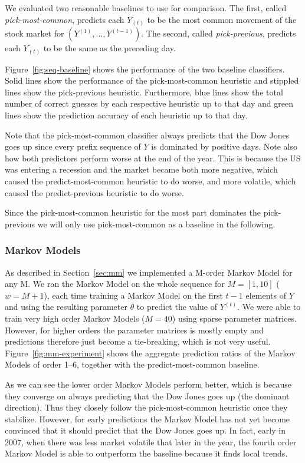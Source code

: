 \documentclass[10pt, twocolumn]{article}
\begin{document}
We evaluated two reasonable baselines to use for comparison.
The first, called \emph{pick-most-common}, predicts each $Y_{(t)}$ to be the most common movement of the stock market for $(Y^{(1)}, ..., Y^{(t-1)})$.
The second, called \emph{pick-previous}, predicts each $Y_{(t)}$ to be the same as the preceding day.

Figure~\ref{fig:seq-baseline} shows the performance of the two baseline classifiers.
Solid lines show the performance of the pick-most-common heuristic and stippled lines show the pick-previous heuristic.
Furthermore, blue lines show the total number of correct guesses by each respective heuristic up to that day and green lines show the prediction accuracy of each heuristic up to that day.

Note that the pick-most-common classifier always predicts that the Dow Jones goes up since every prefix sequence of $Y$ is dominated by positive days. 
Note also how both predictors perform worse at the end of the year.
This is because the US was entering a recession and the market became both more negative, which caused the predict-most-common heuristic to do worse, and more volatile, which caused the predict-previous heuristic to do worse.

Since the pick-most-common heuristic for the most part dominates the pick-previous we will only use pick-most-common as a baseline in the following.


\subsubsection{Markov Models}
\label{mm-eval}

As described in Section~\ref{sec:mm} we implemented a M-order Markov Model for any M.
We ran the Markov Model on the whole sequence for $M=[1,10]$ ($w=M+1$), each time training a Markov Model on the first $t-1$ elements of $Y$ and using the resulting parameter $\theta$ to predict the value of $Y^{(t)}$.
We were able to train very high order Markov Models ($M=40$) using sparse parameter matrices.
However, for higher orders the parameter matrices is mostly empty and predictions therefore just become a tie-breaking, which is not very useful.
Figure~\ref{fig:mm-experiment} shows the aggregate prediction ratios of the Markov Models of order 1--6, together with the predict-most-common baseline.

As we can see the lower order Markov Models perform better, which is because they converge on always predicting that the Dow Jones goes up (the dominant direction). Thus they closely follow the pick-most-common heuristic once they stabilize.
However, for early predictions the Markov Model has not yet become convinced that it should predict that the Dow Jones goes up. In fact, early in 2007, when there was less market volatile that later in the year, the fourth order Markov Model is able to outperform the baseline because it finds local trends.
\end{document}

